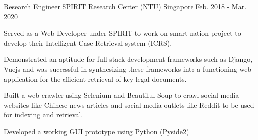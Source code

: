 \begin{cventries}
  \cventry
    {Research Engineer} %
    {SPIRIT Research Center (NTU)} %
    {Singapore} %
    {Feb. 2018 - Mar. 2020} %
    {
      \begin{cvitems} %
        \item {Served as a Web Developer under SPIRIT to work on smart nation project to develop their Intelligent Case Retrieval system (ICRS).}
        \item {Demonstrated an aptitude for full stack development frameworks such as Django, Vuejs and was successful in synthesizing these frameworks into a functioning web application for the efficient retrieval of key legal documents.}
        \item {Built a web crawler using Selenium and Beautiful Soup to crawl social media websites like Chinese news articles and social media outlets like Reddit to be used for indexing and retrieval.}
        \item {Developed a working GUI prototype using Python (Pyside2) }
      \end{cvitems}
    }




\end{cventries}
